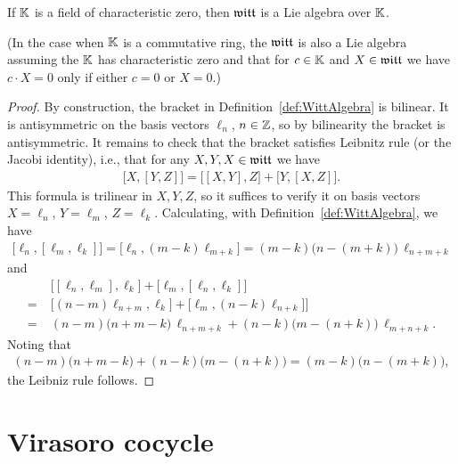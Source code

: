 \begin{lemma}
  \label{lem:WittAlgebraIsLieAlgebra}
  \leanok
  If $\mathbb{K}$ is a field of characteristic zero, then $\mathfrak{witt}$ is
  a Lie algebra over $\mathbb{K}$.

  (In the case when $\mathbb{K}$ is a commutative ring, the $\mathfrak{witt}$ is also
  a Lie algebra assuming the $\mathbb{K}$ has characteristic zero and
  that for $c \in \mathbb{K}$ and $X \in \mathfrak{witt}$ we have $c \cdot X = 0$ only if
  either $c = 0$ or $X = 0$.)
\end{lemma}
\begin{proof}
  \leanok
  By construction, the bracket in Definition~\ref{def:WittAlgebra} is
  bilinear. It is antisymmetric on the basis vectors $\ell_n$, $n \in \mathbb{Z}$,
  so by bilinearity the bracket is antisymmetric.
  It remains to check that the bracket satisfies Leibnitz rule
  (or the Jacobi identity), i.e., that for any $X, Y, X \in \mathfrak{witt}$ we have
  \begin{align*}
    \big[X, [Y, Z] \big] = \big[[X, Y] , Z \big] + \big[Y , [X, Z] \big] .
  \end{align*}
  This formula is trilinear in $X,Y,Z$, so it suffices to verify it on
  basis vectors $X = \ell_n$, $Y = \ell_m$, $Z = \ell_k$.
  Calculating, with Definition~\ref{def:WittAlgebra}, we have
  \begin{align*}
      \big[\ell_n, [\ell_m, \ell_k] \big]
    = \big[\ell_n, (m-k) \ell_{m+k} \big]
    = (m-k) \big(n-(m+k)\big) \, \ell_{n+m+k}
  \end{align*}
  and
  \begin{align*}
         & \big[[\ell_n, \ell_m] , \ell_k \big] + \big[\ell_m , [\ell_n, \ell_k] \big] \\
    = \; & \big[(n-m) \ell_{n+m} , \ell_k \big] + \big[\ell_m , (n-k) \ell_{n+k}] \big] \\
    = \; & (n-m) \big( n+m-k \big) \, \ell_{n+m+k}  + (n-k) \big( m-(n+k) \big) \, \ell_{m+n+k} .
  \end{align*}
  Noting that
  \begin{align*}
    (n-m) \big( n+m-k \big) + (n-k) \big( m-(n+k) \big)
    = (m-k) \big(n-(m+k)\big) ,
  \end{align*}
  the Leibniz rule follows.
\end{proof}

\section{Virasoro cocycle}

